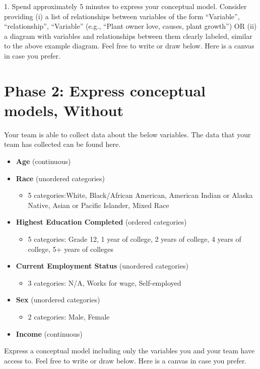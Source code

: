 1. Spend approximately 5 minutes to express your conceptual model. Consider
providing (i) a list of relationships between variables of the form ``Variable'',
``relationship'', ``Variable'' (e.g., ``Plant owner love, causes, plant growth'') OR
(ii) a diagram with variables and relationships between them clearly labeled,
similar to the above example diagram. Feel free to write or draw below. Here is
a canvas in case you prefer. 

\clearpage
\section*{Phase 2: Express conceptual models, Without \rTisane}
Your team is able to collect data about the below variables. The data that your team has collected can be found here. 
\begin{itemize}
    \item \textbf{Age} (continuous)
    \item \textbf{Race} (unordered categories)
    \begin{itemize}
        \item 5 categories:White, Black/African American, American Indian or Alaska Native, Asian or Pacific Islander, Mixed Race
    \end{itemize}
    \item \textbf{Highest Education Completed} (ordered categories)
    \begin{itemize}
        \item 5 categories: Grade 12, 1 year of college, 2 years of college, 4 years of college, 5+ years of colleges
    \end{itemize}
    \item \textbf{Current Employment Status} (unordered categories)
	\begin{itemize}
        \item 3 categories: N/A, Works for wage, Self-employed
    \end{itemize}
    \item \textbf{Sex} (unordered categories)
    \begin{itemize}
        \item 2 categories: Male, Female
    \end{itemize}
    \item \textbf{Income} (continuous)
\end{itemize}

Express a conceptual model including only the variables you and your team have
access to. Feel free to write or draw below. Here is a canvas in case you
prefer. 


